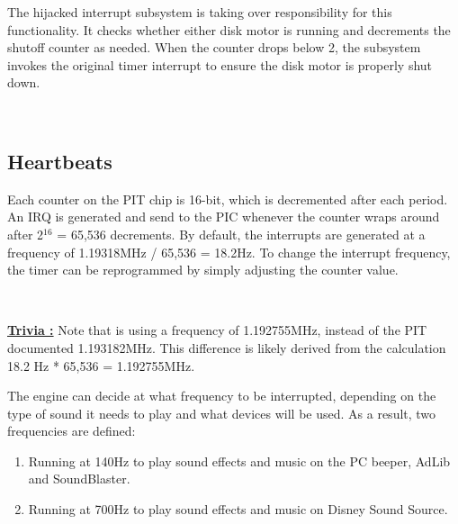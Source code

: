 \documentclass[book.tex]{subfiles}
\begin{document}
\par
The hijacked interrupt subsystem is taking over responsibility for this functionality. It checks whether either disk motor is running and decrements the shutoff counter as needed. When the counter drops below 2, the subsystem invokes the original timer interrupt to ensure the disk motor is properly shut down.\\

\par
\begin{minipage}{\textwidth}

\end{minipage}\\
\par

\subsection{Heartbeats}
Each counter on the PIT chip is 16-bit, which is decremented after each period. An IRQ is generated and send to the PIC whenever the counter wraps around after 2$^{16}$ = 65,536 decrements. By default, the interrupts are generated at a frequency of 1.19318MHz / 65,536 = 18.2Hz. To change the interrupt frequency, the timer can be reprogrammed by simply adjusting the counter value.\\

\par
\begin{minipage}{\textwidth}

\end{minipage}\\
\par

\textbf{\underline{Trivia :}} Note that  is using a frequency of 1.192755MHz, instead of the PIT documented 1.193182MHz. This difference is likely derived from the calculation 18.2 Hz * 65,536 = 1.192755MHz.\\

\par
The engine can decide at what frequency to be interrupted, depending on the type of sound it needs to play and what devices will be used. As a result, two frequencies are defined:
\begin{enumerate}
\item Running at 140Hz to play sound effects and music on the PC beeper, AdLib and SoundBlaster.
\item Running at 700Hz to play sound effects and music on Disney Sound Source.
\end{enumerate}
\par
\begin{minipage}{\textwidth}

\end{minipage}
\end{document}
